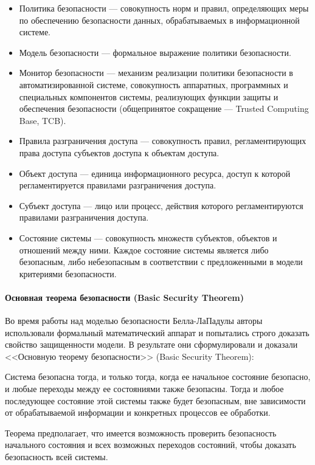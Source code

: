 \begin{itemize}
	\item Политика безопасности --- совокупность норм и правил, определяющих меры по обеспечению безопасности данных, обрабатываемых в информационной системе.
	\item Модель безопасности --- формальное выражение политики безопасности.
	\item Монитор безопасности --- механизм реализации политики безопасности в автоматизированной системе, совокупность аппаратных, программных и специальных компонентов системы, реализующих функции защиты и обеспечения безопасности (общепринятое сокращение --- Trusted Computing Base, TCB).
	\item Правила разграничения доступа --- совокупность правил, регламентирующих права доступа субъектов доступа к объектам доступа.
	\item Объект доступа --- единица информационного ресурса, доступ к которой регламентируется правилами разграничения доступа.
	\item Субъект доступа --- лицо или процесс, действия которого регламентируются правилами разграничения доступа.
	\item Состояние системы --- совокупность множеств субъектов, объектов и отношений между ними. Каждое состояние системы является либо безопасным, либо небезопасным в соответствии с предложенными в модели критериями безопасности.
\end{itemize}

\paragraph{Основная теорема безопасности (Basic Security Theorem)}

Во время работы над моделью безопасности Белла-ЛаПадулы авторы использовали формальный математический аппарат и попытались строго доказать свойство защищенности модели. В результате они сформулировали и доказали <<Основную теорему безопасности>> (Basic Security Theorem):

\begin{grayquote}
Система безопасна тогда, и только тогда, когда ее начальное состояние безопасно, и любые переходы между ее состояниями также безопасны. Тогда и любое последующее состояние этой системы также будет безопасным, вне зависимости от обрабатываемой информации и конкретных процессов ее обработки.
\end{grayquote}

Теорема предполагает, что имеется возможность проверить безопасность начального состояния и всех возможных переходов состояний, чтобы доказать безопасность всей системы.

